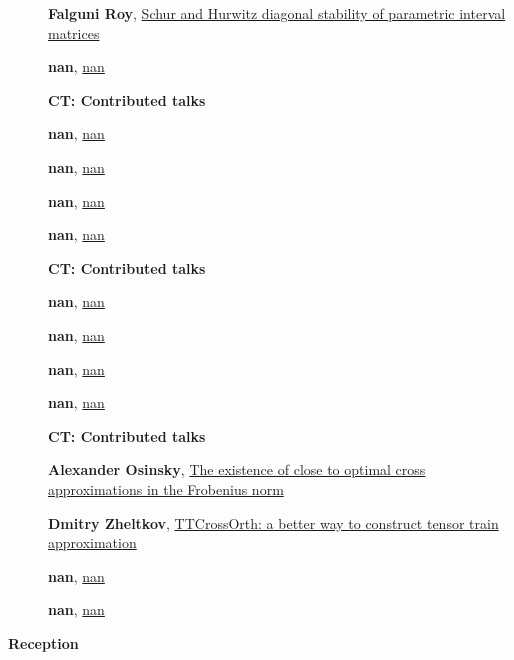 \documentclass[ILAS2025-program.tex]{subfiles}
\begin{document}
\begin{description}
\begin{description}
        \item[] \hypertarget{up0106}{}\textbf{Falguni Roy}, \hyperlink{down0106}{Schur and Hurwitz diagonal stability of parametric interval matrices}
        \item[] \hypertarget{up0107}{}\textbf{nan}, \hyperlink{down0107}{nan}
        \end{description}
    \begin{description}
    \item[] {\color{mstitle}\textbf{CT: Contributed talks}} 
    \item[] \hypertarget{up0108}{}\textbf{nan}, \hyperlink{down0108}{nan}
        \item[] \hypertarget{up0109}{}\textbf{nan}, \hyperlink{down0109}{nan}
        \item[] \hypertarget{up0110}{}\textbf{nan}, \hyperlink{down0110}{nan}
        \item[] \hypertarget{up0111}{}\textbf{nan}, \hyperlink{down0111}{nan}
        \end{description}
    \begin{description}
    \item[] {\color{mstitle}\textbf{CT: Contributed talks}} 
    \item[] \hypertarget{up0112}{}\textbf{nan}, \hyperlink{down0112}{nan}
        \item[] \hypertarget{up0113}{}\textbf{nan}, \hyperlink{down0113}{nan}
        \item[] \hypertarget{up0114}{}\textbf{nan}, \hyperlink{down0114}{nan}
        \item[] \hypertarget{up0115}{}\textbf{nan}, \hyperlink{down0115}{nan}
        \end{description}
    \begin{description}
    \item[] {\color{mstitle}\textbf{CT: Contributed talks}} 
    \item[] \hypertarget{up0116}{}\textbf{Alexander Osinsky}, \hyperlink{down0116}{The existence of close to optimal cross approximations in the Frobenius norm}
        \item[] \hypertarget{up0117}{}\textbf{Dmitry Zheltkov}, \hyperlink{down0117}{TTCrossOrth: a better way to construct tensor train approximation}
        \item[] \hypertarget{up0118}{}\textbf{nan}, \hyperlink{down0118}{nan}
        \item[] \hypertarget{up0119}{}\textbf{nan}, \hyperlink{down0119}{nan}
        \end{description}
    \item[\info{18:00\textrm{--}20:00}] \textbf{Reception} 
    \end{description}
    \newpage
\end{document}
